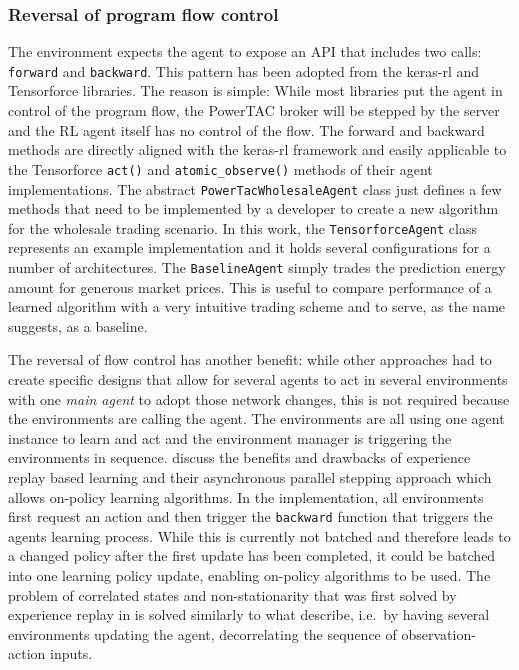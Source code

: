 \subsubsection{Reversal of program flow control}%
\label{sub:reversal_of_flow_control}

The environment expects the agent to expose an \ac{API} that includes two calls: \texttt{forward} and
\texttt{backward}. This pattern has been adopted from the keras-rl and Tensorforce libraries. The reason is simple:
While most libraries put the agent in control of the program flow, the \ac{PowerTAC} broker will be stepped by the
server and the \ac{RL} agent itself has no control of the flow. The forward and backward methods are
directly aligned with the keras-rl framework and easily applicable to the Tensorforce \texttt{act()} and
\texttt{atomic\_observe()} methods of their agent implementations. The abstract \texttt{PowerTacWholesaleAgent} class just defines a
few methods that need to be implemented by a developer to create a new algorithm for the wholesale trading
scenario. In this work, the \texttt{TensorforceAgent} class represents an example implementation and it holds several
configurations for a number of architectures. The \texttt{BaselineAgent} simply trades the prediction
energy amount for generous market prices. This is useful to compare performance of a learned algorithm with a very
intuitive trading scheme and to serve, as the name suggests, as a baseline.

The reversal of flow control has another benefit: while other approaches had to create specific designs that allow for
several agents to act in several environments with one \emph{main agent} to adopt those network changes, this is not
required because the environments are calling the agent. The environments are all using one agent instance to learn and
act and the environment manager is triggering the environments in sequence. \citet{mnih2016asynchronous} discuss the
benefits and drawbacks of experience replay based learning and their asynchronous parallel stepping approach which
allows on-policy learning algorithms. In the implementation, all environments first request an action and then trigger
the \texttt{backward} function that triggers the agents learning process. While this is currently not batched and
therefore leads to a changed policy after the first update has been completed, it could be batched into
one learning policy update, enabling on-policy algorithms to be used. The problem of correlated states and
non-stationarity that was first solved by experience replay in \cite[]{mnih2013playing} is solved similarly to what
\citet{mnih2016asynchronous} describe, i.e.\ by having several environments updating the agent, decorrelating the
sequence of observation-action inputs.

